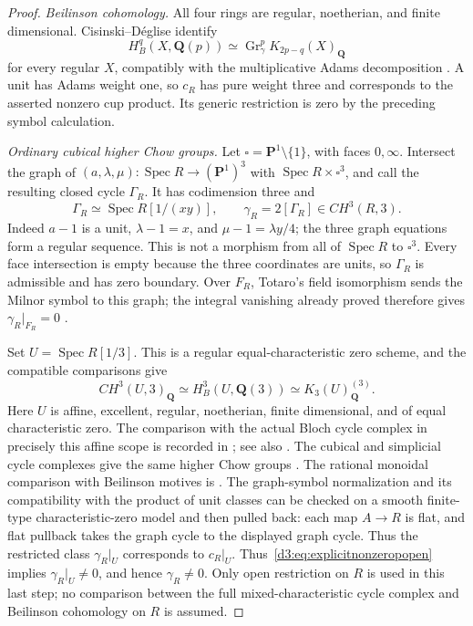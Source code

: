 \begin{proof}
\emph{Beilinson cohomology.}
All four rings are regular, noetherian, and finite dimensional.
Cisinski--D\'eglise identify
\[
 H_B^q(X,\mathbf Q(p))
 \simeq\operatorname{Gr}_\gamma^pK_{2p-q}(X)_{\mathbf Q}
\]
for every regular $X$, compatibly with the multiplicative Adams
decomposition \cite[Corollaries~14.2.14 and~14.2.19]{CisinskiDegliseMotives}.
A unit has Adams weight one, so $c_R$ has pure weight three and
corresponds to the asserted nonzero cup product. Its generic
restriction is zero by the preceding symbol calculation.

\emph{Ordinary cubical higher Chow groups.}
Let $\square=\mathbf P^1\setminus\{1\}$, with faces $0,\infty$.
Intersect the graph of
$(a,\lambda,\mu):\operatorname{Spec}R\to(\mathbf P^1)^3$ with
$\operatorname{Spec}R\times\square^3$, and call the resulting
closed cycle $\Gamma_R$. It has codimension three and
\[
 \Gamma_R\simeq\operatorname{Spec}R[1/(xy)],
 \qquad \gamma_R=2[\Gamma_R]\in CH^3(R,3).
\]
Indeed $a-1$ is a unit, $\lambda-1=x$, and
$\mu-1=\lambda y/4$; the three graph equations form a regular
sequence. This is not a morphism from all of $\operatorname{Spec}R$
to $\square^3$. Every face intersection is empty because the three
coordinates are units, so $\Gamma_R$ is admissible and has zero
boundary. Over $F_R$, Totaro's field isomorphism sends the Milnor
symbol to this graph; the integral vanishing already proved therefore
gives $\gamma_R|_{F_R}=0$
\cite[Theorem~1 and Sections~1--2]{TotaroMilnor}.

Set $U=\operatorname{Spec}R[1/3]$. This is a regular equal-characteristic
zero scheme, and the compatible comparisons give
\[
 CH^3(U,3)_{\mathbf Q}\simeq H_B^3(U,\mathbf Q(3))
       \simeq K_3(U)_{\mathbf Q}^{(3)}.
\]
Here $U$ is affine, excellent, regular, noetherian, finite dimensional,
and of equal characteristic zero. The comparison with the actual
Bloch cycle complex in precisely this affine scope is recorded in
\cite[Remark~1.3.2]{BondarkoIvanovChowWeights}; see also
\cite[Introduction~B, p.~xxii; Theorem~11.1.24 and
Examples~11.1.25 and~11.2.3]{CisinskiDegliseMotives}.
The cubical and simplicial cycle complexes give the same higher Chow
groups \cite[Theorem~4.7]{LevineHigherChowRevisited}.
The rational monoidal comparison with Beilinson motives is
\cite[Theorem~16.1.4 and Corollary~16.1.7]{CisinskiDegliseMotives}.
The graph-symbol normalization and its compatibility with the product
of unit classes can be checked on a smooth finite-type
characteristic-zero model and then pulled back: each map $A\to R$
is flat, and flat pullback takes the graph cycle to the displayed
graph cycle. Thus the restricted class $\gamma_R|_U$ corresponds to
$c_R|_U$.
Thus~\eqref{d3:eq:explicitnonzeropopen} implies
$\gamma_R|_U\ne0$, and hence $\gamma_R\ne0$.
Only open restriction on $R$ is used in this last step; no comparison
between the full mixed-characteristic cycle complex and Beilinson
cohomology on $R$ is assumed.
\end{proof}

